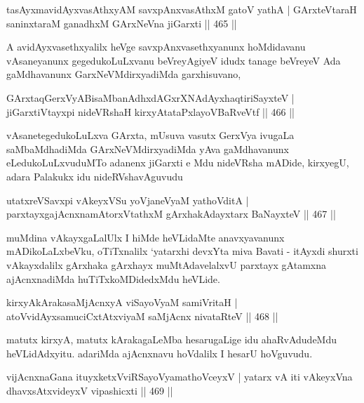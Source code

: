 \begin{shl}
tasAyxmavidAyxvasAthxyAM savxpAnxvasAthxM gatoV yathA |
GArxteVtaraH saninxtaraM ganadhxM GArxNeVna jiGarxti \hfill  || 465 ||
\end{shl}

\begin{artha}
A avidAyxvasethxyalilx heVge savxpAnxvasethxyanunx hoMdidavanu
vAsaneyanunx gegedukoLuLxvanu beVreyAgiyeV idudx tanage beVreyeV Ada
gaMdhavanunx GarxNeVMdirxyadiMda garxhisuvano,
\end{artha}

\begin{shl}
GArxtaqGerxVyABisaMbanAdhxdAGxrXNAdAyxhaqtiriSayxteV |
jiGarxtiVtayxpi nideVRshaH kirxyAtataPxlayoVBaRveVtf \hfill  || 466 ||
\end{shl}

\begin{artha}
vAsanetegedukoLuLxva GArxta, mUsuva vasutx GerxVya ivugaLa
saMbaMdhadiMda GArxNeVMdirxyadiMda yAva gaMdhavanunx eLedukoLuLxvuduMTo
adanenx jiGarxti e	Mdu nideVRsha mADide, kirxyegU, adara Palakukx idu nideRVshavAguvudu
\end{artha}

\begin{shl}
utatxreVSavxpi vAkeyxVSu yoVjaneVyaM yathoVditA |
parxtayxgajAcnxnamAtorxVtathxM gArxhakAdayxtarx BaNayxteV \hfill  || 467 ||
\end{shl}

\begin{artha}
muMdina vAkayxgaLalUlx I hiMde heVLidaMte anavxyavanunx
mADikoLaLxbeVku, oTiTxnalilx `yatarxhi devxYta miva Bavati - itAyxdi
shurxti vAkayxdalilx gArxhaka gArxhayx muMtAdavelalxvU parxtayx
gAtamxna ajAcnxnadiMda huTiTxkoMDidedxMdu heVLide.

\begin{shl}
kirxyAkArakasaMjAcnxyA viSayoV\s yaM samiVritaH |
atoV\s vidAyxsamuciCxtAtxviyaM saMjAcnx nivataRteV \hfill  || 468 ||
\end{shl}

\end{artha}
matutx kirxyA, matutx kArakagaLeMba hesarugaLige idu ahaRvAdudeMdu
heVLidAdxyitu. adariMda ajAcnxnavu hoVdalilx I hesarU hoVguvudu.
\begin{artha}

\end{artha}

\begin{shl}
vijAcnxnaGana ituyxketxVviRSayoV\s yamathoVceyxV |
yatarx vA iti vAkeyxVna dhavxsAtxvideyxV vipashicxti \hfill  || 469 ||
\end{shl}

